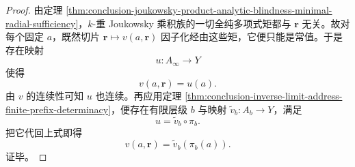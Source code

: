 \begin{proof}
由定理 \ref{thm:conclusion-joukowsky-product-analytic-blindness-minimal-radial-sufficiency}，\(k\)-重 Joukowsky 乘积族的一切全纯多项式矩都与 \(\mathbf r\) 无关。故对每个固定 \(a\)，既然切片 \(\mathbf r\mapsto v(a,\mathbf r)\) 因子化经由这些矩，它便只能是常值。于是存在映射
\[
u:A_\infty\to Y
\]
使得
\[
v(a,\mathbf r)=u(a).
\]
由 \(v\) 的连续性可知 \(u\) 也连续。再应用定理 \ref{thm:conclusion-inverse-limit-address-finite-prefix-determinacy}，便存在有限层级 \(b\) 与映射 \(\widetilde v_b:A_b\to Y\)，满足
\[
u=\widetilde v_b\circ \pi_b.
\]
把它代回上式即得
\[
v(a,\mathbf r)=\widetilde v_b(\pi_b(a)).
\]
证毕。
\end{proof}

\endinput
